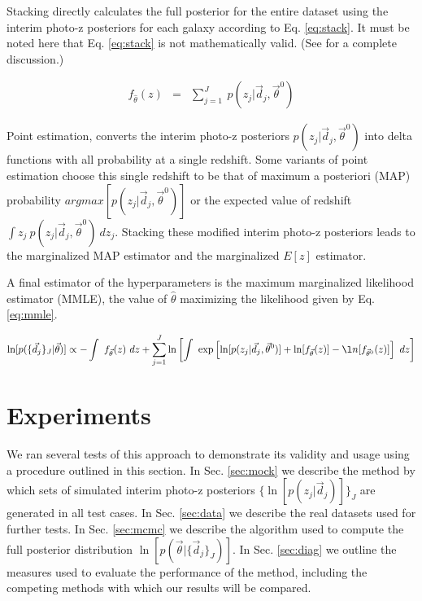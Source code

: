 \documentclass[preprint]{aastex}
\begin{document}
Stacking directly calculates the full posterior for the entire dataset using 
the interim photo-z posteriors for each galaxy according to Eq. \ref{eq:stack}. 
 \citep{Lima2008}  It must be noted here that Eq. \ref{eq:stack} is not 
mathematically valid.  (See \citet{Hogg2012} for a complete discussion.)  

\begin{eqnarray}
\label{eq:stack}
f_{\hat{\theta}}(z) &=& \sum_{j=1}^{J}\ p(z_{j}|\vec{d}_{j},\vec{\theta}^{0})
\end{eqnarray}

Point estimation, converts the interim photo-z posteriors 
$p(z_{j}|\vec{d}_{j},\vec{\theta}^{0})$ into delta functions with all 
probability at a single redshift.  Some variants of point estimation choose 
this single redshift to be that of maximum a posteriori (MAP) probability 
$argmax[p(z_{j}|\vec{d}_{j},\vec{\theta}^{0})]$ or the expected value of 
redshift $\int z_{j}\ p(z_{j}|\vec{d}_{j},\vec{\theta}^{0})\ dz_{j}$.  Stacking 
these modified interim photo-z posteriors leads to the marginalized MAP 
estimator and the marginalized $E[z]$ estimator.

A final estimator of the hyperparameters is the maximum marginalized likelihood 
estimator (MMLE), the value of $\hat{\theta}$ maximizing the likelihood given 
by Eq. \ref{eq:mmle}.

\begin{eqnarray}
\label{eq:mmle}
\ln[p(\{\vec{d}_{j}\}_{J}|\vec{\theta})] \propto -\int\ f_{\vec{\theta}}(z)\ 
dz+\sum_{j=1}^{J}\ln\left[\int\ 
\exp\left[\ln[p(z_{j}|\vec{d}_{j},\vec{\theta}^{0})]+\ln[f_{\vec{\theta}}(z)]-\l
n[f_{\vec{\theta}^{0}}(z)]\right]\ dz\right]
\end{eqnarray}

\clearpage
\section{Experiments}
\label{sec:exp}

We ran several tests of this approach to demonstrate its validity and usage 
using a procedure outlined in this section.  In Sec. \ref{sec:mock} we describe 
the method by which sets of simulated interim photo-z posteriors 
$\{\ln[p(z_{j}|\vec{d}_{j})]\}_{J}$ are generated in all test cases.  In Sec. 
\ref{sec:data} we describe the real datasets used for further tests.  In Sec. 
\ref{sec:mcmc} we describe the algorithm used to compute the full posterior 
distribution $\ln[p(\vec{\theta}|\{\vec{d}_{j}\}_{J})]$.  In Sec. 
\ref{sec:diag} we outline the measures used to evaluate the performance of the 
method, including the competing methods with which our results will be compared.
\end{document}
